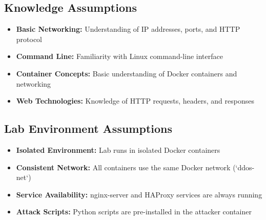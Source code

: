 \documentclass[12pt]{article}
\begin{document}
\subsection{Knowledge Assumptions}
\begin{itemize}
    \item \textbf{Basic Networking:} Understanding of IP addresses, ports, and HTTP protocol
    \item \textbf{Command Line:} Familiarity with Linux command-line interface
    \item \textbf{Container Concepts:} Basic understanding of Docker containers and networking
    \item \textbf{Web Technologies:} Knowledge of HTTP requests, headers, and responses
\end{itemize}

\subsection{Lab Environment Assumptions}
\begin{itemize}
    \item \textbf{Isolated Environment:} Lab runs in isolated Docker containers
    \item \textbf{Consistent Network:} All containers use the same Docker network (`ddos-net`)
    \item \textbf{Service Availability:} nginx-server and HAProxy services are always running
    \item \textbf{Attack Scripts:} Python scripts are pre-installed in the attacker container
\end{itemize}
\end{document}
